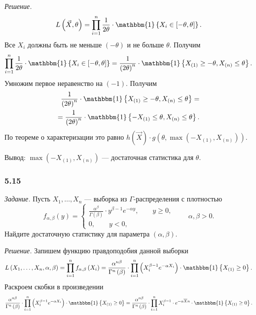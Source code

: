 \textit{Решение.}
$$L \left( \vec{X}, \theta \right) =
  \prod \limits_{i = 1}^n
    \frac{1}{2 \theta } \cdot
    \mathbbm{1} \left\{ X_i \in \left[ - \theta, \theta \right] \right\}.$$
Все $X_i$ должны быть не меньше $ \left( - \theta \right) $ и не больше $ \theta $.
Получим
$$ \prod \limits_{i = 1}^n
    \frac{1}{2 \theta } \cdot
    \mathbbm{1} \left\{ X_i \in \left[ - \theta, \theta \right] \right\} =
  \frac{1}{ \left( 2 \theta \right)^n} \cdot
  \mathbbm{1} \left\{
    X_{ \left( 1 \right) } \geq - \theta, X_{ \left( n \right) } \leq \theta
  \right\}.$$
Умножим первое неравенство на $ \left( -1 \right) $.
Получим
\begin{equation*}
  \begin{split}
    \frac{1}{ \left( 2 \theta \right)^n} \cdot
    \mathbbm{1} \left\{
      X_{ \left( 1 \right) } \geq - \theta, X_{ \left( n \right) } \leq \theta
    \right\} = \\
    = \frac{1}{ \left( 2 \theta \right)^n} \cdot
    \mathbbm{1} \left\{
      - X_{ \left( 1 \right) } \leq \theta, X_{ \left( n \right) } \leq \theta
    \right\}.
  \end{split}
\end{equation*}
По теореме о характеризации это равно
$h \left( \vec{X} \right) \cdot
  g \left( \theta, \max \left( -X_{ \left( 1 \right) }, X_{ \left( n \right) } \right) \right).$

Вывод: $\max \left( -X_{ \left( 1 \right) }, X_{ \left( n \right) } \right) $ ---
достаточная статистика для $ \theta $.

\subsubsection*{5.15}

\textit{Задание.} Пусть $X_1, \dotsc, X_n$ --- выборка из $ \Gamma $-распределения с плотностью
$$f_{ \alpha, \beta } \left( y \right) =
  \begin{cases}
    \frac{ \alpha^{ \beta}}{ \Gamma \left( \beta \right) } \cdot y^{ \beta - 1} e^{- \alpha y},
    \qquad y \geq 0, \\
    0, \qquad y < 0,
  \end{cases} \qquad \alpha, \beta > 0.$$
Найдите достаточную статистику для параметра $ \left( \alpha, \beta \right) $.

\textit{Решение.} Запишем функцию правдоподобия данной выборки
$$L \left( X_1, \dotsc, X_n, \alpha, \beta \right) =
  \prod \limits_{i = 1}^n f_{ \alpha, \beta } \left( X_i \right) =
  \frac{ \alpha^{n \beta }}{ \Gamma^n \left( \beta \right) } \cdot
  \prod \limits_{i = 1}^n \left( X_i^{ \beta - 1} e^{- \alpha X_i} \right) \cdot
  \mathbbm{1} \left\{ X_{ \left( 1 \right) } \geq 0 \right\}.$$
Раскроем скобки в произведении
$$ \frac{ \alpha^{n \beta }}{ \Gamma^n \left( \beta \right) } \cdot
  \prod \limits_{i = 1}^n \left( X_i^{ \beta - 1} e^{- \alpha X_i} \right) \cdot
  \mathbbm{1} \left\{ X_{ \left( 1 \right) } \geq 0 \right\} =
  \frac{ \alpha^{n \beta }}{ \Gamma^n \left( \beta \right) } \cdot
  \prod \limits_{i = 1}^n X_i^{ \beta - 1} \cdot e^{- \alpha \overline{X} n} \cdot
  \mathbbm{1} \left\{ X_{ \left( 1 \right) } \geq 0 \right\}.$$


